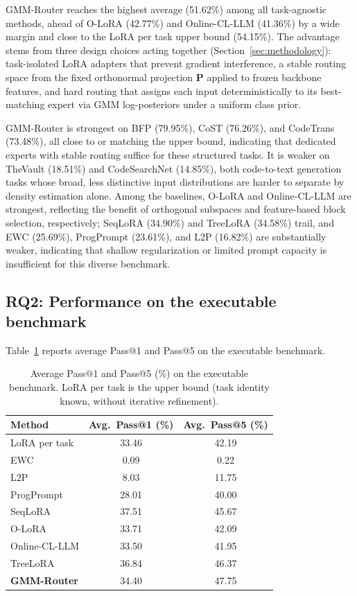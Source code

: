 GMM-Router reaches the highest average (51.62\%) among all task-agnostic methods, ahead of O-LoRA (42.77\%) and Online-CL-LLM (41.36\%) by a wide margin and close to the LoRA per task upper bound (54.15\%). The advantage stems from three design choices acting together (Section~\ref{sec:methodology}): task-isolated LoRA adapters that prevent gradient interference, a stable routing space from the fixed orthonormal projection $\mathbf{P}$ applied to frozen backbone features, and hard routing that assigns each input deterministically to its best-matching expert via GMM log-posteriors under a uniform class prior.

GMM-Router is strongest on BFP (79.95\%), CoST (76.26\%), and CodeTrans (73.48\%), all close to or matching the upper bound, indicating that dedicated experts with stable routing suffice for these structured tasks. It is weaker on TheVault (18.51\%) and CodeSearchNet (14.85\%), both code-to-text generation tasks whose broad, less distinctive input distributions are harder to separate by density estimation alone. Among the baselines, O-LoRA and Online-CL-LLM are strongest, reflecting the benefit of orthogonal subspaces and feature-based block selection, respectively; SeqLoRA (34.90\%) and TreeLoRA (34.58\%) trail, and EWC (25.69\%), ProgPrompt (23.61\%), and L2P (16.82\%) are substantially weaker, indicating that shallow regularization or limited prompt capacity is insufficient for this diverse benchmark.

\subsection{RQ2: Performance on the executable benchmark}
\label{sec:exec_results}

Table~\ref{tab:exec_avg} reports average Pass@1 and Pass@5 on the executable benchmark.

\begin{table}[t]
\centering
\caption{Average Pass@1 and Pass@5 (\%) on the executable benchmark. LoRA per task is the upper bound (task identity known, without iterative refinement).}
\label{tab:exec_avg}
\small
\begin{tabular}{lcc}
\toprule
Method & Avg.\ Pass@1 (\%) & Avg.\ Pass@5 (\%) \\
\midrule
LoRA per task & 33.46 & 42.19 \\
\midrule
EWC & 0.09 & 0.22 \\
L2P & 8.03 & 11.75 \\
ProgPrompt & 28.01 & 40.00 \\
SeqLoRA & 37.51 & 45.67 \\
O-LoRA & 33.71 & 42.09 \\
Online-CL-LLM & 33.50 & 41.95 \\
TreeLoRA & 36.84 & 46.37 \\
\midrule
\textbf{GMM-Router} & 34.40 & 47.75 \\
\bottomrule
\end{tabular}
\end{table}

